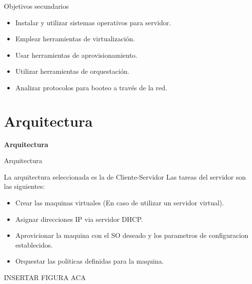 \documentclass{beamer}
\begin{document}
\begin{frame}{Objetivos secundarios}

\vspace{-1.5cm}
\begin{itemize}
    \item Instalar y utilizar sistemas operativos para servidor.
    \item Emplear herramientas de virtualización.
    \item Usar herramientas de aprovisionamiento.
    \item Utilizar herramientas de orquestación.
    \item Analizar protocolos para booteo a través de la red.
\end{itemize}

\end{frame}

\section{Arquitectura}

\begin{frame}
    \Huge
    \centering
    \textbf{ Arquitectura }

\end{frame}

\begin{frame}{Arquitectura}

\vspace{-1.5cm}
La arquitectura seleccionada es la de Cliente-Servidor
Las tareas del servidor son las siguientes:
\begin{itemize}
    \item Crear las maquinas virtuales (En caso de utilizar un servidor virtual).
    \item Asignar direcciones IP via servidor DHCP.
    \item Aprovicionar la maquina con el SO deseado y los parametros de configuracion establecidos.
    \item Orquestar las politicas definidas para la maquina.
\end{itemize}
 INSERTAR FIGURA ACA

\end{frame}
\end{document}
